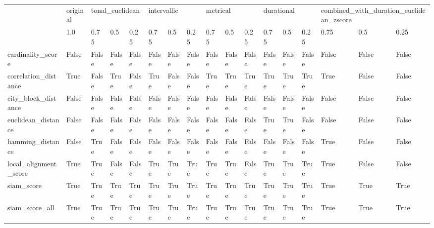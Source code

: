\begin{tabular}{lllllllllllllllll}
\toprule
{} & original & \multicolumn{3}{l}{tonal\_euclidean} & \multicolumn{3}{l}{intervallic} & \multicolumn{3}{l}{metrical} & \multicolumn{3}{l}{durational} & \multicolumn{3}{l}{combined\_with\_duration\_euclidean\_zscore} \\
{} & 1.0 & 0.75 & 0.5 & 0.25 & 0.75 & 0.5 & 0.25 & 0.75 & 0.5 & 0.25 & 0.75 & 0.5 & 0.25 & 0.75 & 0.5 & 0.25 \\
\midrule
cardinality\_score     & False & False & False & False & False & False & False & False & False & False & False & False & False & False & False & False \\
correlation\_distance  & True & False & True & False & True & False & False & True & True & True & True & True & True & True & False & False \\
city\_block\_distance   & False & False & False & False & False & False & False & False & False & False & False & False & False & False & False & False \\
euclidean\_distance    & False & False & False & False & False & False & False & False & False & False & True & True & False & False & False & False \\
hamming\_distance      & False & True & False & False & False & False & False & False & False & False & False & False & False & True & False & False \\
local\_alignment\_score & True & True & False & False & True & True & True & True & True & False & True & True & True & True & False & False \\
siam\_score            & True & True & True & True & True & True & True & True & True & True & True & True & True & True & True & True \\
siam\_score\_all        & True & True & True & True & True & True & True & True & True & True & True & True & True & True & True & True \\
\bottomrule
\end{tabular}

